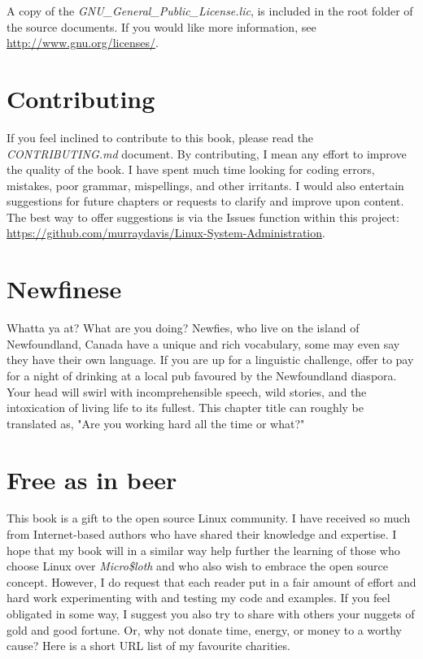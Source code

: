A copy of the \textsl{GNU\_General\_Public\_License.lic}, is included in the root folder of the source documents.  If you would like more information, see \href{http://www.gnu.org/licenses}{http://www.gnu.org/licenses/}.

\section{Contributing}

If you feel inclined to contribute to this book, please read the \textsl{CONTRIBUTING.md} document. By contributing, I mean any effort to improve the quality of the book. I have spent much time looking for coding errors, mistakes, poor grammar, mispellings, and other irritants. I would also entertain suggestions for future chapters or requests to clarify and improve upon content. The best way to offer suggestions is via the Issues function within this  project: \href{https://github.com/murraydavis/Linux-System-Administration}{https://github.com/murraydavis/Linux-System-Administration}.

\section{Newfinese}

Whatta ya at? What are you doing? Newfies, who live on the island of Newfoundland, Canada have a unique and rich vocabulary, some may even say they have their own language. If you are up for a linguistic challenge, offer to pay for a night of drinking at a local pub favoured by the Newfoundland diaspora. Your head will swirl with incomprehensible speech, wild stories, and the intoxication of living life to its fullest. This chapter title can roughly be translated as, "Are you working hard all the time or what?"

\section{Free as in beer}

This book is a gift to the open source Linux community. I have received so much from Internet-based authors who have shared their knowledge and expertise. I hope that my book will in a similar way help further the learning of those who choose Linux over \emph{Micro\$loth} and who also wish to embrace the open source concept. However, I do request that each reader put in a fair amount of effort and hard work experimenting with and testing my code and examples. If you feel obligated in some way, I suggest you also try to share with others your nuggets of gold and good fortune. Or, why not donate time, energy, or money to a worthy cause? Here is a short URL list of my favourite charities. 

